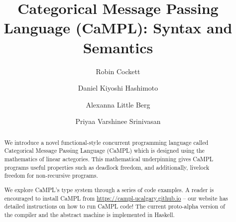 \documentclass[acmsmall]{acmart}
\begin{document}
\title[CaMPL: Syntax and Semantics]{Categorical Message Passing Language (CaMPL): \newline Syntax and Semantics}

\author{Robin Cockett}

\author{Daniel Kiyoshi Hashimoto}
\authornotemark[1]

\author{Alexanna {Little Berg}}
\authornotemark[1]

\author{Priyaa Varshinee Srinivasan}
\authornotemark[1]

\renewcommand{\shortauthors}{Cockett, Hashimoto, Little Berg, Srinivasan}

\begin{abstract}
We introduce a novel functional-style concurrent programming language called Categorical Message Passing Language (CaMPL) which is designed using the mathematics of linear actegories. 
This mathematical underpinning gives CaMPL programs useful properties such as deadlock freedom, and additionally, livelock freedom for non-recursive programs.

We explore CaMPL's type system through a series of code examples. 
A reader is encouraged to install CaMPL from \url{https://campl-ucalgary.github.io} -- our website has detailed instructions on how to run CaMPL code!
The current proto-alpha version of the compiler and the abstract machine is implemented in Haskell. 
\end{abstract}
\end{document}
